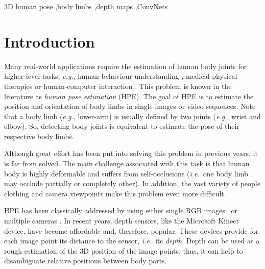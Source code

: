 \documentclass[review,12pt,3p]{elsarticle}
\def \eg{\textit{e.g.}}
\def \ie{\textit{i.e.}}
\begin{document}
\begin{frontmatter}
\begin{keyword}
3D human pose \sep body limbs \sep depth maps \sep ConvNets   %

\end{keyword}

\end{frontmatter}


\section{Introduction} \label{sec:intro}
%
Many real-world applications require the estimation of human body joints for higher-level tasks, \eg, human behaviour understanding \citep{Ferrari09,zhu2014eccv}, medical physical therapies \citep{obdrvzalek2012real,achilles2016miccai} or human-computer interaction \citep{huo2009amigas,Shotton2013pami}. This problem is known in the literature as \textit{human pose estimation} (HPE). The goal of HPE is to estimate the position and orientation of body limbs in single images or video sequences. Note that a body limb (\eg, lower-arm) is usually defined by two joints (\eg, wrist and elbow). So, detecting body joints is equivalent to estimate the pose of their respective body limbs.

Although great effort has been put into solving this problem in previous years, it is far from solved. The main challenge associated with this task is that human body is highly deformable and suffers from self-occlusions (\ie~one body limb may occlude partially or completely other). In addition, the vast variety of people clothing and camera viewpoints make this problem even more difficult.

%
HPE has been classically addressed by using either single RGB images~\citep{Agarwal06,Eichner2012ijcv,Cherian14,rogez2017lcr} or multiple cameras \citep{Shen2011,LopezQuintero2017}.
In recent years, depth sensors, like the Microsoft Kinect device, have become affordable and, therefore, popular. These devices provide for each image point its distance to the sensor, \ie~its \textit{depth}. Depth can be used as a rough estimation of the 3D position of the image points, thus, it can help to disambiguate relative positions between body parts. 
\end{document}
